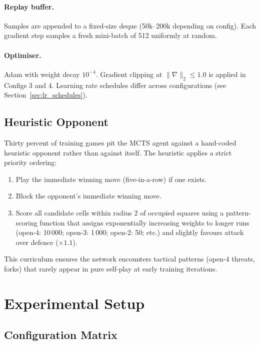\documentclass[11pt,a4paper]{article}
\begin{document}
\paragraph{Replay buffer.}
Samples are appended to a fixed-size deque (50k--200k depending on config).
Each gradient step samples a fresh mini-batch of 512 uniformly at random.

\paragraph{Optimiser.}
Adam \citep{kingma2014adam} with weight decay $10^{-4}$.  Gradient clipping at
$\|\nabla\|_2 \le 1.0$ is applied in Configs 3 and 4.  Learning rate schedules
differ across configurations (see Section~\ref{sec:lr_schedules}).

\subsection{Heuristic Opponent}

Thirty percent of training games pit the MCTS agent against a hand-coded
heuristic opponent rather than against itself.  The heuristic applies a strict
priority ordering:
\begin{enumerate}
  \item Play the immediate winning move (five-in-a-row) if one exists.
  \item Block the opponent's immediate winning move.
  \item Score all candidate cells within radius 2 of occupied squares using a
        pattern-scoring function that assigns exponentially increasing weights to
        longer runs (open-4: 10\,000; open-3: 1\,000; open-2: 50; etc.) and
        slightly favours attack over defence ($\times 1.1$).
\end{enumerate}
This curriculum ensures the network encounters tactical patterns (open-4 threats,
forks) that rarely appear in pure self-play at early training iterations.

\section{Experimental Setup}
\label{sec:setup}

\subsection{Configuration Matrix}
\label{sec:configs}
\end{document}

